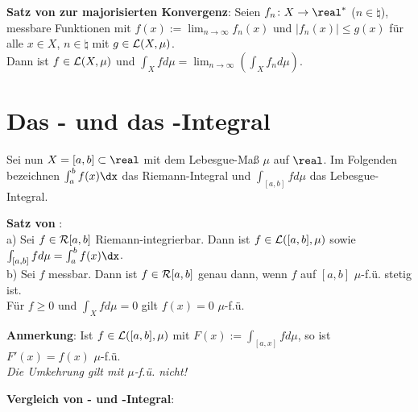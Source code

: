 \textbf{Satz von  zur majorisierten Konvergenz}:
Seien $f_n\colon X \rightarrow \real^\ast$ ($n \in \natural$),
messbare Funktionen mit
$f(x) := \lim_{n \to \infty} f_n(x)$ und
$|f_n(x)| \le g(x)$ für alle $x \in X$, $n \in \natural$
mit $g \in \mathcal{L}(X, \mu)$. \\
Dann ist $f \in \mathcal{L}(X, \mu)$ und
$\int_X f d\mu = \lim_{n \to \infty} \left(\int_X f_n d\mu\right)$.

\section{%
    Das - und das -Integral%
}

Sei nun $X = [a, b] \subset \real$ mit dem Lebesgue-Maß $\mu$ auf $\real$.
Im Folgenden bezeichnen $\int_a^b f(x)\dx$ das Riemann-Integral und
$\int_{[a,b]} f d\mu$ das Lebesgue-Integral.

\textbf{Satz von }: \\
a) Sei $f \in \mathcal{R}[a, b]$ Riemann-integrierbar.
Dann ist $f \in \mathcal{L}([a,b], \mu)$ sowie
$\int_{[a,b]} f d\mu = \int_a^b f(x)\dx$. \\
b) Sei $f$ messbar.
Dann ist $f \in \mathcal{R}[a, b]$ genau dann, wenn $f$ auf $[a, b]$ $\mu$-f.ü.
stetig ist. \\
Für $f \ge 0$ und $\int_X f d\mu = 0$ gilt $f(x) = 0$ $\mu$-f.ü.

\textbf{Anmerkung}:
Ist $f \in \mathcal{L}([a, b], \mu)$ mit $F(x) := \int_{[a, x]} f d\mu$, so ist
$F'(x) = f(x)$ $\mu$-f.ü. \\
\emph{Die Umkehrung gilt mit $\mu$-f.ü. nicht!}

\linie

\textbf{Vergleich von - und -Integral}:


